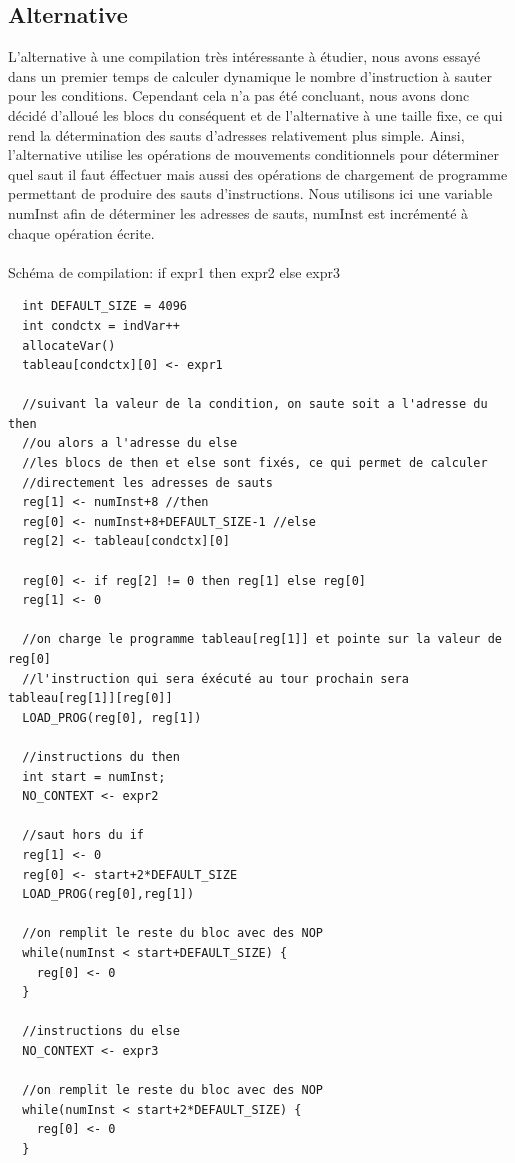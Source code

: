\documentclass[a4paper,12pt]{report}
\begin{document}
\subsection{Alternative}
L'alternative à une compilation très intéressante à étudier, nous avons essayé dans un premier temps de calculer dynamique le nombre
d'instruction à sauter pour les conditions. Cependant cela n'a pas été concluant, nous avons donc décidé d'alloué les blocs du 
conséquent et de l'alternative à une taille fixe, ce qui rend la détermination des sauts d'adresses relativement plus simple.
Ainsi, l'alternative utilise les opérations de mouvements conditionnels pour déterminer quel saut il faut éffectuer mais aussi des
opérations de chargement de programme permettant de produire des sauts d'instructions.
Nous utilisons ici une variable numInst afin de déterminer les adresses de sauts, numInst est incrémenté à chaque opération écrite.
\\ \\
Schéma de compilation: if expr1 then expr2 else expr3
\begin{verbatim}
  int DEFAULT_SIZE = 4096
  int condctx = indVar++
  allocateVar()
  tableau[condctx][0] <- expr1
  
  //suivant la valeur de la condition, on saute soit a l'adresse du then
  //ou alors a l'adresse du else
  //les blocs de then et else sont fixés, ce qui permet de calculer
  //directement les adresses de sauts
  reg[1] <- numInst+8 //then
  reg[0] <- numInst+8+DEFAULT_SIZE-1 //else
  reg[2] <- tableau[condctx][0]
  
  reg[0] <- if reg[2] != 0 then reg[1] else reg[0]
  reg[1] <- 0
  
  //on charge le programme tableau[reg[1]] et pointe sur la valeur de reg[0]
  //l'instruction qui sera éxécuté au tour prochain sera tableau[reg[1]][reg[0]]
  LOAD_PROG(reg[0], reg[1])
    
  //instructions du then
  int start = numInst;
  NO_CONTEXT <- expr2
    
  //saut hors du if
  reg[1] <- 0
  reg[0] <- start+2*DEFAULT_SIZE
  LOAD_PROG(reg[0],reg[1])
    
  //on remplit le reste du bloc avec des NOP
  while(numInst < start+DEFAULT_SIZE) {
    reg[0] <- 0
  }
    
  //instructions du else
  NO_CONTEXT <- expr3
    
  //on remplit le reste du bloc avec des NOP
  while(numInst < start+2*DEFAULT_SIZE) {
    reg[0] <- 0
  }
\end{verbatim}
\end{document}
